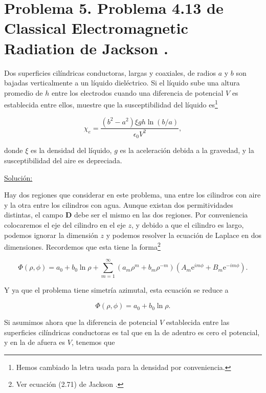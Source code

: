 \documentclass[a4paper,11pt]{article}
\numberwithin{equation}{section}
\newcommand{\euler}{\mathrm{e}}
\begin{document}
\newpage

\section{Problema 5. Problema 4.13 de Classical Electromagnetic Radiation
de Jackson \cite{jackson}.}

Dos superficies cilíndricas conductoras, largas y coaxiales, de radios $a$ y $b$ 
son bajadas verticalmente a un líquido dieléctrico. Si el líquido sube una altura 
promedio de $h$ entre los electrodos cuando una diferencia de potencial $V$ es 
establecida entre ellos, muestre que la susceptibilidad del líquido es\footnote{Hemos 
cambiado la letra usada para la densidad por conveniencia.}

$$
\chi_e = \frac{(b^2 - a^2)\xi g h \ln{(b/a)}}{\epsilon_0 V^2},
$$

donde $\xi$ es la densidad del líquido, $g$ es la aceleración debida a la gravedad, 
y la susceptibilidad del aire es depreciada.

\vspace{.3cm}

\underline{Solución:} \vspace{.3cm}

Hay dos regiones que considerar en este problema, una entre los cilindros con aire 
y la otra entre los cilindros con agua. Aunque existan dos permitividades distintas, 
el campo $\mathbf{D}$ debe ser el mismo en las dos regiones. Por conveniencia colocaremos 
el eje del cilindro en el eje $z$, y debido a que el cilindro es largo, podemos 
ignorar la dimensión $z$ y podemos resolver la ecuación de Laplace en dos dimensiones. 
Recordemos que esta tiene la forma\footnote{Ver ecuación (2.71) de Jackson \cite{jackson}.}

\begin{equation}
 \Phi(\rho,\phi) = a_0 + b_0 \ln{\rho} + \sum_{m=1}^\infty (a_m \rho^m + b_m \rho^{-m})
 (A_m \euler^{im\phi} + B_m \euler^{-im\phi}).
\end{equation}

Y ya que el problema tiene simetría azimutal, esta ecuación se reduce a 

\begin{equation}
 \Phi(\rho,\phi) = a_0 + b_0 \ln{\rho}.
\end{equation}

Si asumimos ahora que la diferencia de potencial $V$ establecida entre las superficies 
cilíndricas conductoras es tal que en la de adentro es cero el potencial, y en la 
de afuera es $V$, tenemos que 
\end{document}
